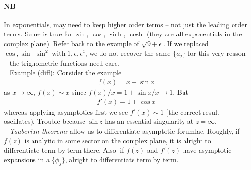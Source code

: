 \paragraph{NB} In exponentials, may need to keep higher order terms -- not just the leading order terms. Same is true for $\sin$, $\cos$, $\sinh$, $\cosh$ (they are all exponentials in the complex plane). Refer back to the example of $\sqrt{9+\epsilon}$. If we replaced $\cos,\sin,\sin^2$ with $1,\epsilon,\epsilon^2$, we do not recover the same $\{a_j\}$ for this very reason -- the trignometric functions need care. \\
\ \newline
\underline{Example (diff):} Consider the example
\begin{gather*}
	f(x) = x + \sin x
\end{gather*}
as $x \rightarrow \infty$, $f(x) \sim x$ since $f(x)/x = 1 + \sin x/x \rightarrow 1$. But 
\begin{gather*}
	f'(x) = 1 + \cos x
\end{gather*}
whereas applying asymptotics first we see $f'(x) \sim 1$ (the correct result oscillates). Trouble because $\sin z$ has an essential singularity at $z = \infty$. \\
\ \newline 
\emph{Tauberian theorems} allow us to differentiate asymptotic forumlae. Roughly, if $f(z)$ is analytic in some sector on the complex plane, it is alright to differentiate term by term there. Also, if $f(z)$ and $f'(z)$ have asymptotic expansions in a $\{\phi_j\}$, alright to differentiate term by term.


